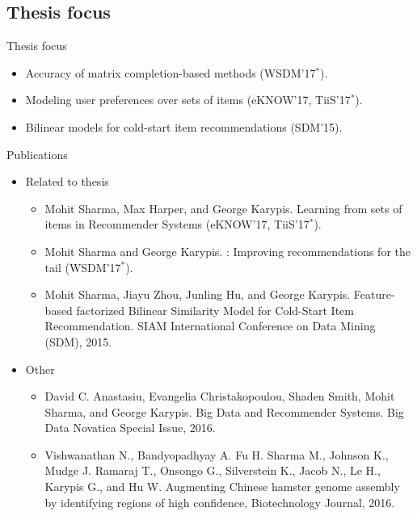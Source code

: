 \subsection{Thesis focus}

\begin{frame}{Thesis focus}
    \begin{itemize}
        \item Accuracy of matrix completion-based methods (WSDM'17$^*$).
        \item Modeling user preferences over sets of items (eKNOW'17, TiiS'17$^*$).
        \item Bilinear models for cold-start item recommendations (SDM'15).
    \end{itemize}
\end{frame}

\begin{frame}{Publications}
    \begin{itemize}
        \item Related to thesis
            \begin{itemize}
                \item Mohit Sharma, Max Harper, and George Karypis. Learning from sets of items in
                  Recommender Systems (eKNOW'17, TiiS'17$^*$).
                \item Mohit Sharma and George Karypis. \TMF: Improving recommendations for the tail (WSDM'17$^*$).
                \item Mohit Sharma, Jiayu Zhou, Junling Hu, and George Karypis.
                  Feature-based factorized Bilinear Similarity Model for Cold-Start \TOPN
                  Item Recommendation. SIAM International Conference on Data Mining (SDM), 2015.
            \end{itemize}
        \item Other
        \begin{itemize}
            \item David C. Anastasiu, Evangelia Christakopoulou, Shaden Smith, Mohit
              Sharma, and George Karypis. Big Data and Recommender Systems. Big Data
              Novatica Special Issue, 2016.
            \item Vishwanathan N., Bandyopadhyay A. Fu H. Sharma M., Johnson K.,
              Mudge J. Ramaraj T., Onsongo G., Silverstein K., Jacob N., Le H.,
              Karypis G., and Hu W. Augmenting Chinese hamster genome assembly by identifying regions
              of high confidence, Biotechnology Journal, 2016.
        \end{itemize}
    \end{itemize}
\end{frame}




